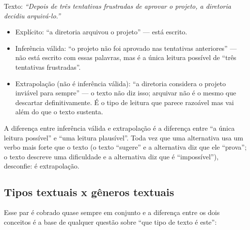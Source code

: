 \begin{exemplo}
Texto: \textit{“Depois de três tentativas frustradas de aprovar o projeto, a
diretoria decidiu arquivá-lo.”}

\begin{itemize}
\item Explícito: “a diretoria arquivou o projeto” --- está escrito.
\item Inferência válida: “o projeto não foi aprovado nas tentativas
anteriores” --- não está escrito com essas palavras, mas é a única leitura
possível de “três tentativas frustradas”.
\item Extrapolação (não é inferência válida): “a diretoria considera o
projeto inviável para sempre” --- o texto não diz isso; arquivar não é o
mesmo que descartar definitivamente. É o tipo de leitura que parece razoável
mas vai além do que o texto sustenta.
\end{itemize}
\end{exemplo}

\begin{cuidado}
A diferença entre inferência válida e extrapolação é a diferença entre
“a única leitura possível” e “uma leitura plausível”. Toda vez que uma
alternativa usa um verbo mais forte que o texto (o texto “sugere” e a
alternativa diz que ele “prova”; o texto descreve uma dificuldade e a
alternativa diz que é “impossível”), desconfie: é extrapolação.
\end{cuidado}

\subsection{Tipos textuais x gêneros textuais}

Esse par é cobrado quase sempre em conjunto e a diferença entre os dois
conceitos é a base de qualquer questão sobre “que tipo de texto é este”:


